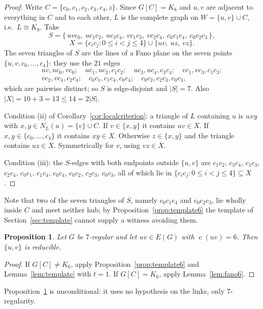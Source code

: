 \documentclass[11pt,a4paper]{amsart}
\theoremstyle{plain}
\newtheorem{proposition}[theorem]{Proposition}
\theoremstyle{definition}
\newcommand{\cod}{\operatorname{c}}
\newcommand{\N}{N}
\begin{document}
\begin{proof}
Write $C=\{c_0,c_1,c_2,c_3,c_4,z\}$. Since $G[C]=K_6$ and $u,v$ are adjacent
to everything in $C$ and to each other, $L$ is the complete graph on
$W=\{u,v\}\cup C$, i.e.\ $L\cong K_8$. Take
\[
  S=\{\,uvc_0,\ uc_1c_2,\ uc_3c_4,\ vc_1c_3,\ vc_2c_4,\ c_0c_1c_4,\
        c_0c_2c_3\,\},
\]
\[
  X=\{c_ic_j : 0\le i<j\le 4\}\cup\{uv,\ uz,\ vz\}.
\]
The seven triangles of $S$ are the lines of a Fano plane on the seven points
$\{u,v,c_0,\dots,c_4\}$: they use the $21$ edges
\[
  \begin{array}{l}
  uv,uc_0,vc_0;\quad uc_1,uc_2,c_1c_2;\quad uc_3,uc_4,c_3c_4;\quad
  vc_1,vc_3,c_1c_3;\\
  vc_2,vc_4,c_2c_4;\quad c_0c_1,c_1c_4,c_0c_4;\quad c_0c_2,c_2c_3,c_0c_3,
  \end{array}
\]
which are pairwise distinct; so $S$ is edge-disjoint and $|S|=7$. Also
$|X|=10+3=13\le 14=2|S|$.

Condition (ii) of Corollary~\ref{cor:localcriterion}: a triangle of $L$
containing $u$ is $uxy$ with $x,y\in \N_L(u)=\{v\}\cup C$. If $v\in\{x,y\}$ it
contains $uv\in X$. If $x,y\in\{c_0,\dots,c_4\}$ it contains
$xy\in X$. Otherwise $z\in\{x,y\}$ and the triangle contains $uz\in X$.
Symmetrically for $v$, using $vz\in X$.

Condition (iii): the $S$-edges with both endpoints outside $\{u,v\}$ are
$c_1c_2$, $c_3c_4$, $c_1c_3$, $c_2c_4$, $c_0c_1$, $c_1c_4$, $c_0c_4$,
$c_0c_2$, $c_2c_3$, $c_0c_3$, all of which lie in
$\{c_ic_j: 0\le i<j\le 4\}\subseteq X$.
\end{proof}

Note that two of the seven triangles of $S$, namely $c_0c_1c_4$ and
$c_0c_2c_3$, lie wholly inside $C$ and meet neither hub; by
Proposition~\ref{prop:template6} the template of
Section~\ref{sec:template} cannot supply a witness avoiding them.

\begin{proposition}\label{prop:codeg6}
Let $G$ be $7$-regular and let $uv\in E(G)$ with $\cod(uv)=6$. Then
$\{u,v\}$ is reducible.
\end{proposition}

\begin{proof}
If $G[C]\ne K_6$, apply Proposition~\ref{prop:template6} and
Lemma~\ref{lem:template} with $t=1$. If $G[C]=K_6$, apply
Lemma~\ref{lem:fano6}.
\end{proof}

Proposition~\ref{prop:codeg6} is unconditional: it uses no hypothesis on the
links, only $7$-regularity.
\end{document}
